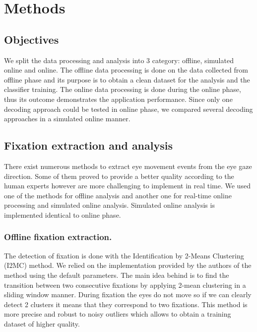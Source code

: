 \documentclass[12pt]{iopart}
\begin{document}

\section{Methods}
\subsection{Objectives}
We split the data processing and analysis into 3 category:
offline, simulated online and online.
The offline data processing is done on the data collected from offline phase
and its purpose is to obtain
a clean dataset for the analysis and the classifier training.
The online data processing is done during the online phase,
thus its outcome demonstrates the application performance.
Since only one decoding approach could be tested in online
phase, we compared several decoding approaches in a simulated online manner.

\label{sec:methods}
\subsection{Fixation extraction and analysis}
There exist numerous methods to extract eye movement events
from the eye gaze direction. Some of them proved to provide
a better quality according to the human experts
however are more challenging to implement in real time.
We used one of the methods for offline analysis and another one
for real-time online processing and simulated online analysis.
Simulated online analysis is implemented identical to online phase.


\subsubsection*{Offline fixation extraction.}
The detection of fixation is done with the Identification by 2-Means Clustering (I2MC) method.
We relied on the implementation provided by the authors of the method
using the default parameters.
The main idea behind is to find the transition between two consecutive fixations
by applying 2-mean clustering in a sliding window manner.
During fixation the eyes do not move so if we can clearly detect
2 clusters it means that they correspond to two fixations.
This method is more precise and robust to noisy outliers which
allows to obtain a training dataset of higher quality.
\end{document}

